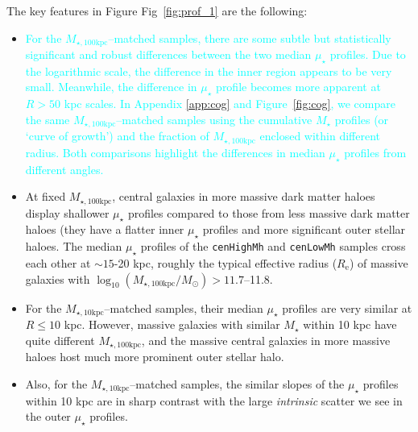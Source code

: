 \documentclass[a4paper,fleqn,usenatbib]{mnras}
\def\rbcg{\texttt{cenHighMh}}
\def\nbcg{\texttt{cenLowMh}}
\def\mstar{{$M_{\star}$}}
\def\minn{{$M_{\star,10\mathrm{kpc}}$}}
\def\mtot{{$M_{\star,100\mathrm{kpc}}$}}
\def\logmtot{{$\log_{10} (M_{\star,100\mathrm{kpc}}/M_{\odot})$}}
\def\mden{{$\mu_{\star}$}}
\newcommand{\song}[1]{\textcolor{cyan}{#1}}
\begin{document}
    The key features in Figure Fig~\ref{fig:prof_1} are the following:
    
    \begin{itemize}
        
        \item \song{
            For the \mtot{}--matched samples, there are some subtle but statistically 
            significant and robust differences between the two median \mden{} profiles.
            Due to the logarithmic scale, the difference in the inner region appears 
            to be very small. 
            Meanwhile, the difference in \mden{} profile becomes more apparent 
            at $R>50$ kpc scales.  
            In Appendix \ref{app:cog} and Figure~\ref{fig:cog}, we compare the same
            \mtot{}--matched samples using the cumulative \mstar{} profiles 
            (or `curve of growth') and the fraction of \mtot{} enclosed within 
            different radius.
            Both comparisons highlight the differences in median \mden{} profiles 
            from different angles.
            }
            
        \item At fixed \mtot{}, central galaxies in more massive dark matter haloes 
            display shallower \mden{} profiles compared to those from less massive 
            dark matter haloes (they have a flatter inner \mden{} profiles and 
            more significant outer stellar haloes. 
            The median \mden{} profiles of the \rbcg{} and \nbcg{} samples cross 
            each other at ${\sim} 15$-20 kpc, roughly the typical effective radius 
            ($R_{\mathrm{e}}$) of massive galaxies with \logmtot{}$>11.7$--11.8.      
            
        \item For the \minn{}--matched samples, their median \mden{} profiles 
            are very similar at $R \leq 10$ kpc. 
            However, massive galaxies with similar \mstar{} within 10 kpc have quite
            different \mtot{}, and the massive central galaxies in 
            more massive haloes host much more prominent outer stellar halo. 
    
        \item Also, for the \minn{}--matched samples, the similar slopes of the 
            \mden{} profiles within 10 kpc are in sharp contrast with the large
            \textit{intrinsic} scatter we see in the outer \mden{} profiles. 
                        
    \end{itemize}
\end{document}
